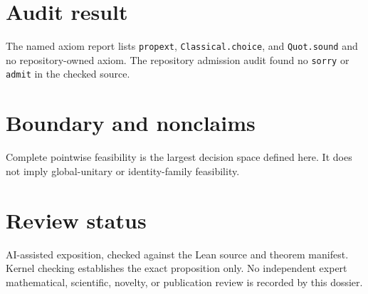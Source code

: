 \documentclass[11pt]{article}
\begin{document}
\section{Audit result}
The named axiom report lists \texttt{propext}, \texttt{Classical.choice}, and
\texttt{Quot.sound} and no repository-owned axiom.  The repository admission audit found no
\texttt{sorry} or \texttt{admit} in the checked source.

\section{Boundary and nonclaims}
Complete pointwise feasibility is the largest decision space defined here.  It does not imply global-unitary or identity-family feasibility.

\section{Review status}
AI-assisted exposition, checked against the Lean source and theorem manifest.  Kernel checking
establishes the exact proposition only.  No independent expert mathematical, scientific,
novelty, or publication review is recorded by this dossier.
\end{document}
